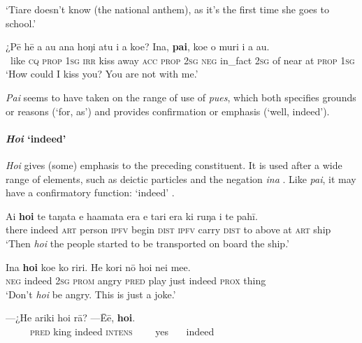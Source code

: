 \glt 
‘Tiare doesn’t know (the national anthem), as it’s the first time she goes to school.’ \textstyleExampleref{[R334.023]} 
\z

\ea\label{ex:4.164}
\gll ¿Pē hē a au ana hoŋi atu i a koe? {\ꞌ}Ina, \textbf{pa{\ꞌ}i}, koe o muri i a au. \\
~like \textsc{cq} \textsc{prop} \textsc{1sg} \textsc{irr} kiss away \textsc{acc} \textsc{prop} \textsc{2sg} \textsc{neg} in\_fact \textsc{2sg} of near at \textsc{prop} \textsc{1sg} \\

\glt
‘How could I kiss you? You are not with me.’ \textstyleExampleref{[R228.006–007]}
\z

\textit{Pa{\ꞌ}i} seems to have taken on the range of use of  \textit{pues}, which both specifies grounds or reasons (‘for, as’) and provides confirmation or emphasis (‘well, indeed’).
\paragraph{\textit{Ho{\ꞌ}i} ‘indeed’}\label{sec:4.5.4.2.2} \textit{Ho{\ꞌ}i} gives (some) emphasis to the preceding constituent. It is used after a wide range of elements, such as deictic particles  and the negation \textit{{\ꞌ}ina} . Like \textit{pa{\ꞌ}i}, it may have a confirmatory function: ‘indeed’ .

\ea\label{ex:4.165}
\gll {\ꞌ}Ai \textbf{ho{\ꞌ}i} te taŋata e ha{\ꞌ}amata era e tari era ki ruŋa i te pahī. \\
there indeed \textsc{art} person \textsc{ipfv} begin \textsc{dist} \textsc{ipfv} carry \textsc{dist} to above at \textsc{art} ship \\

\glt 
‘Then \textit{ho{\ꞌ}i} the people started to be transported on board the ship.’ \textstyleExampleref{[R210.040]} 
\z

\ea\label{ex:4.166}
\gll {\ꞌ}Ina \textbf{ho{\ꞌ}i} koe ko riri. He kori nō ho{\ꞌ}i nei me{\ꞌ}e. \\
\textsc{neg} indeed \textsc{2sg} \textsc{prom} angry \textsc{pred} play just indeed \textsc{prox} thing \\

\glt 
‘Don’t \textit{ho{\ꞌ}i} be angry. This is just a joke.’ \textstyleExampleref{[R315.040–041]}
\z

\ea\label{ex:4.167}
\gll —¿He {\ꞌ}ariki ho{\ꞌ}i rā? —{\ꞌ}Ēē, \textbf{ho{\ꞌ}i}. \\
~~~~~\textsc{pred} king indeed \textsc{intens} ~~~~yes~~~ indeed \\

